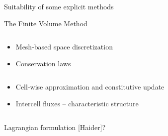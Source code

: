 \begin{frame}{Suitability of some explicit methods}
\begin{block}{The Finite Volume Method \cite{Leveque}}
\begin{overprint}
\begin{columns}
\begin{footnotesize}
\begin{column}{0.4\textwidth}
\begin{itemize}
            \item[] Mesh-based space discretization
            \item[] Conservation laws
            \end{itemize}
          \end{column}
          \begin{column}{0.6\textwidth}
            \begin{itemize}
            \item[] Cell-wise approximation and constitutive update
            \item[] Intercell fluxes -- characteristic structure \cite{Godunov_method}
            \end{itemize}
          \end{column}
        \end{footnotesize}
      \end{columns}
      \vskip -10pt
      \begin{columns}
        \begin{column}{0.48\textwidth}
          \begin{block}{\footnotesize Lagrangian formulation \cite{Maire_FVM} [Haider]?}
            \centering
          \end{block}
        \end{column}
        \begin{column}{0.48\textwidth}
              

\end{column}
\end{columns}
\end{overprint}
\end{block}
\end{frame}
